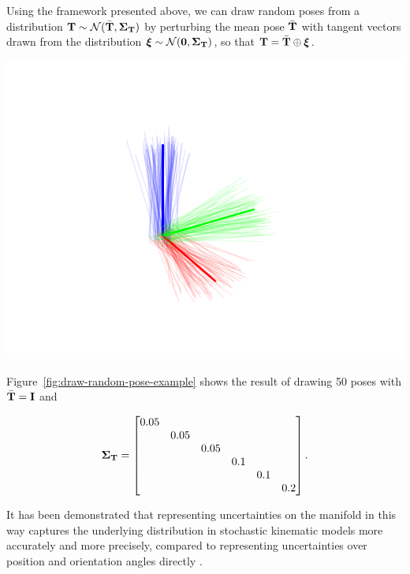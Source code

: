 \begin{example}[frametitle=Drawing random poses from a Gaussian distribution]
Using the framework presented above, we can draw random poses from a distribution ${\boldsymbol{\mathbf{T}}} \sim \mathcal{N}(\bar{{\boldsymbol{\mathbf{T}}}}, {\boldsymbol{\mathbf{\Sigma}}}_{\boldsymbol{\mathbf{T}}})$ by perturbing the mean pose $\bar{{\boldsymbol{\mathbf{T}}}}$ with tangent vectors drawn from the distribution ${\boldsymbol{\mathbf{\xi}}} \sim \mathcal{N}(\boldsymbol{\mathbf{0}}, {\boldsymbol{\mathbf{\Sigma}}}_{\boldsymbol{\mathbf{T}}})$, so that ${\boldsymbol{\mathbf{T}}} = \bar{{\boldsymbol{\mathbf{T}}}} \oplus {\boldsymbol{\mathbf{\xi}}}$.

{
  \centering
  \includegraphics[width=0.75\columnwidth]{figures/draw-random-pose.pdf}
  \captionsetup{type=figure}
  \label{fig:draw-random-pose-example}
  \par
}

Figure~\ref{fig:draw-random-pose-example} shows the result of drawing 50 poses with $\bar{{\boldsymbol{\mathbf{T}}}} = {\boldsymbol{\mathbf{I}}}$ and

\begin{equation*}
  {\boldsymbol{\mathbf{\Sigma}}}_{\boldsymbol{\mathbf{T}}} =
  \begin{bmatrix}
    0.05 & & & & & \\
    & 0.05& & & & \\
    & & 0.05 & & & \\
    & & & 0.1 & & \\
    & & & & 0.1 & \\
    & & & & & 0.2 \\
  \end{bmatrix}.
\end{equation*}
\end{example}

It has been demonstrated that representing uncertainties on the manifold in this way captures the underlying distribution in stochastic kinematic models more accurately and more precisely, compared to representing uncertainties over position and orientation angles directly \cite{Long2012TheCoordinates}.

